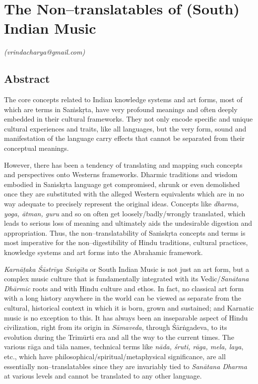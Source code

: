 
\chapter{The Non–translatables of (South) Indian Music}\label{chapter2}


\begin{flushright}
\textit{(vrindacharya@gmail.com)}
\end{flushright}


\section*{Abstract}

The core concepts related to Indian knowledge systems and art forms, most of which are terms in Saṁskṛta, have very profound meanings and often deeply embedded in their cultural frameworks. They not only encode specific and unique cultural experiences and traits, like all languages, but the very form, sound and manifestation of the language carry effects that cannot be separated from their conceptual meanings.

However, there has been a tendency of translating and mapping such concepts and perspectives onto Westerns frameworks. Dharmic traditions and wisdom embodied in Saṁskṛta language get compromised, shrunk or even demolished once they are substituted with the alleged Western equivalents which are in no way adequate to precisely represent the original ideas. Concepts like \textit{dharma, yoga, ātman, guru} and so on often get loosely/badly/wrongly translated, which leads to serious loss of meaning and ultimately aids the undesirable digestion and appropriation. Thus, the non–translatability of Saṁskṛta concepts and terms is most imperative for the non–digestibility of Hindu traditions, cultural practices, knowledge systems and art forms into the Abrahamic framework.

\textit{Karnāṭaka Śāstrīya Saṅgīta} or South Indian Music is not just an art form, but a complex music culture that is fundamentally integrated with its Vedic/\textit{Sanātana Dhārmic} roots and with Hindu culture and ethos. In fact, no classical art form with a long history anywhere in the world can be viewed as separate from the cultural, historical context in which it is born, grown and sustained; and Karnatic music is no exception to this. It has always been an inseparable aspect of Hindu civilization, right from its origin in \textit{Sāmaveda}, through Śārṅgadeva, to its evolution during the Trimūrti era and all the way to the current times. The various rāga and tāla names, technical terms like \textit{nāda, śruti, rāga, mela, laya}, etc., which have philosophical/spiritual/metaphysical significance, are all essentially non–translatables since they are invariably tied to \textit{Sanātana Dharma} at various levels and cannot be translated to any other language.

